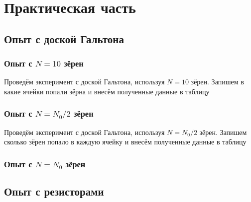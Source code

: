 \section{Практическая часть}
\subsection{Опыт с доской Гальтона}

\subsubsection{Опыт с $N = 10$ зёрен}

Проведём эксперимент с доской Гальтона, используя $N = 10$ зёрен. Запишем в какие ячейки попали зёрна и внесём полученные данные в таблицу

\subsubsection{Опыт с $N = N_0 / 2$ зёрен}

Проведём эксперимент с доской Гальтона, используя $N = N_0 / 2$ зёрен. Запишем сколько зёрен попало в каждую ячейку и внесём полученные данные в таблицу


\subsubsection{Опыт с $N = N_0$ зёрен} 


\subsection{Опыт с резисторами}

